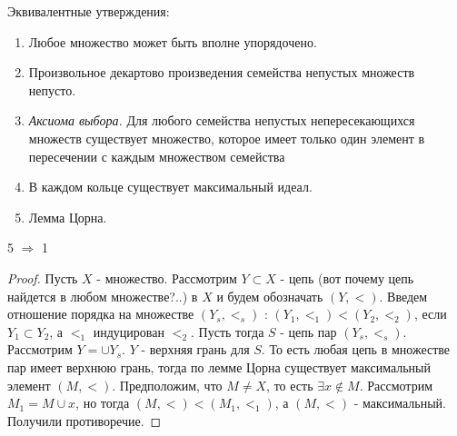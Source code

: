 \pagebreak

Эквивалентные утверждения:

\begin{enumerate}
  \item Любое множество может быть вполне упорядочено.
  \item Произвольное декартово произведения семейства непустых множеств непусто. 
  \item \emph{Аксиома выбора.} Для любого семейства непустых непересекающихся множеств существует множество, которое имеет
        только один элемент в пересечении с каждым множеством семейства
  \item В каждом кольце существует максимальный идеал.
  \item Лемма Цорна.
\end{enumerate}

\begin{thm}
  5 $ \Rightarrow $ 1
\end{thm}

\begin{proof}
  Пусть $ X $ - множество. Рассмотрим $ Y \subset X $ - цепь (вот почему цепь найдется в любом множестве?..) в $ X $ 
  и будем обозначать $ (Y, <) $. Введем отношение порядка
  на множестве $ (Y_{s}, <_{s}) $ : $ (Y_{1}, <_{1}) < (Y_{2}, <_{2}) $, если $ Y_{1} \subset Y_{2} $, а $ <_{1} $ индуцирован $ <_{2} $.
  Пусть тогда $ S $ - цепь пар $ (Y_{s}, <_{s}) $. Рассмотрим $ Y = \cup{Y_{s}} $. $ Y $ - верхняя грань для $ S $. То есть любая цепь
  в множестве пар имеет верхнюю грань, тогда по лемме Цорна существует максимальный элемент $ (M, <) $. Предположим, что $ M \ne X $, то есть
  $ \exists x \notin M $. Рассмотрим $ M_{1} = M \cup {x} $, но тогда $ (M, <) < (M_{1}, <_{1}) $, а $ (M, <) $ - максимальный. Получили
  противоречие.
\end{proof}

